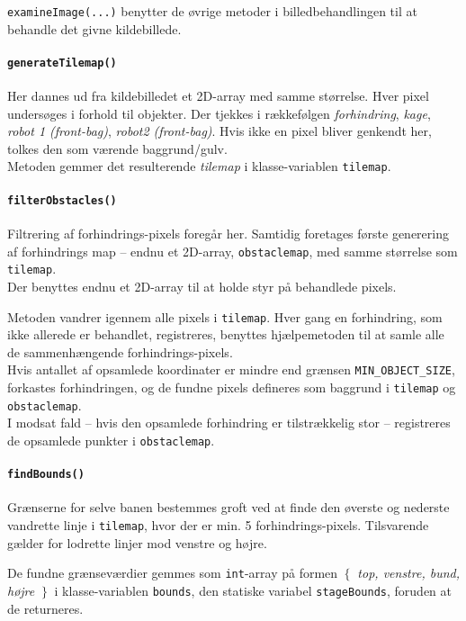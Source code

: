 \texttt{examineImage(...)} benytter de øvrige metoder i billedbehandlingen til at behandle det givne kildebillede.

\paragraph{\texttt{generateTilemap()}}
Her dannes ud fra kildebilledet et 2D-array med samme størrelse. Hver pixel undersøges i forhold til  objekter. Der tjekkes i rækkefølgen \textit{forhindring}, \textit{kage}, \textit{robot 1 (front-bag)}, \textit{robot2 (front-bag)}. Hvis ikke en pixel bliver genkendt her, tolkes den som værende baggrund/gulv.\\
Metoden gemmer det resulterende \textit{tilemap} i klasse-variablen \texttt{tilemap}.

\paragraph{\texttt{filterObstacles()}}
Filtrering af forhindrings-pixels foregår her. Samtidig foretages første generering af forhindrings map -- endnu et 2D-array, \texttt{obstaclemap}, med samme størrelse som \texttt{tilemap}.\\
Der benyttes endnu et 2D-array til at holde styr på behandlede pixels.

Metoden vandrer igennem alle pixels i \texttt{tilemap}. Hver gang en forhindring, som ikke allerede er behandlet, registreres, benyttes hjælpemetoden  til at samle alle de sammenhængende forhindrings-pixels.\\
Hvis antallet af opsamlede koordinater er mindre end grænsen \texttt{MIN\_OBJECT\_SIZE}, forkastes forhindringen, og de fundne pixels defineres som baggrund i \texttt{tilemap} og \texttt{obstaclemap}.\\
I modsat fald -- hvis den opsamlede forhindring er tilstrækkelig stor -- registreres de opsamlede punkter i \texttt{obstaclemap}.

\paragraph{\texttt{findBounds()}}
Grænserne for selve banen bestemmes groft ved at finde den øverste og nederste vandrette linje i \texttt{tilemap}, hvor der er min. 5 forhindrings-pixels. Tilsvarende gælder for lodrette linjer mod venstre og højre.

De fundne grænseværdier gemmes som \texttt{int}-array på formen \textit{$\left\{\right.$ top, venstre, bund, højre $\left.\right\}$} i klasse-variablen \texttt{bounds}, den statiske variabel \texttt{stageBounds}, foruden at de returneres.

